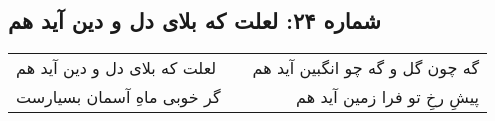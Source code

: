 \begin{center}
\section*{شماره ۲۴: لعلت که بلای دل و دین آید هم}
\label{sec:024}
\begin{longtable}{l p{0.5cm} r}
لعلت که بلای دل و دین آید هم
&&
گه چون گل و گه چو انگبین آید هم
\\
گر خوبی ماهِ آسمان بسیارست
&&
پیشِ رخِ تو فرا زمین آید هم
\\
\end{longtable}
\end{center}
